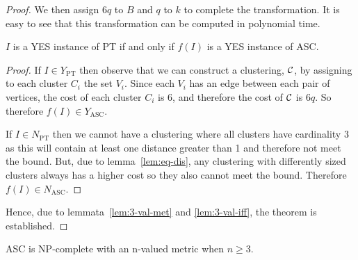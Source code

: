 \begin{proof}
  We then assign $6q$ to $B$ and $q$ to $k$ to complete the transformation.
  It is easy to see that this transformation can be computed in polynomial
  time.

  \begin{lem}
    \label{lem:3-val-iff}
    $I$ is a YES instance of PT if and only if $f(I)$ is a YES instance of ASC.
  \end{lem}

  \begin{proof}
    If $I \in Y_{\text{PT}}$ then observe that we can construct a clustering,
    $\mathcal{C}$, by assigning to each cluster $C_i$ the set $V_i$.  Since each
    $V_i$ has an edge between each pair of vertices, the cost of each cluster
    $C_i$ is $6$, and therefore the cost of $\mathcal{C}$ is $6q$.  So therefore
    $f(I) \in Y_{\text{ASC}}$.

    If $I \in N_{\text{PT}}$ then we cannot have a clustering where all
    clusters have cardinality $3$ as this will contain at least one distance
    greater than 1 and therefore not meet the bound.  But, due to
    lemma~\ref{lem:eq-dis}, any clustering with differently sized clusters
    always has a higher cost so they also cannot meet the bound.  Therefore
    $f(I) \in N_{\text{ASC}}$.
  \end{proof}

  Hence, due to lemmata~\ref{lem:3-val-met} and \ref{lem:3-val-iff}, the
  theorem is established.

\end{proof}

\begin{thm}
  \label{thm:asc-np-complete-n-val}
  ASC is NP-complete with an n-valued metric when $n \geq 3$.
\end{thm}

